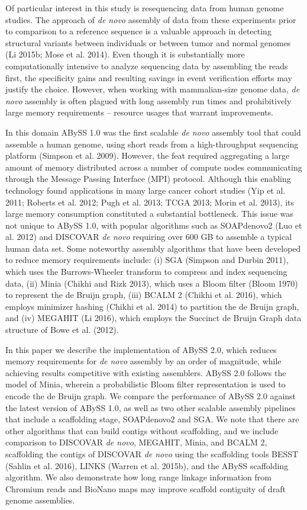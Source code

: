 \documentclass[
  12pt,
  oneside,
  openany]{book}
\begin{document}
Of particular interest in this study is resequencing data from human genome studies. The approach of \emph{de novo} assembly of data from these experiments prior to comparison to a reference sequence is a valuable approach in detecting structural variants between individuals or between tumor and normal genomes (Li 2015b; Mose et al. 2014). Even though it is substantially more computationally intensive to analyze sequencing data by assembling the reads first, the specificity gains and resulting savings in event verification efforts may justify the choice. However, when working with mammalian-size genome data, \emph{de novo} assembly is often plagued with long assembly run times and prohibitively large memory requirements -- resource usages that warrant improvements.

In this domain ABySS 1.0 was the first scalable \emph{de novo} assembly tool that could assemble a human genome, using short reads from a high-throughput sequencing platform (Simpson et al. 2009). However, the feat required aggregating a large amount of memory distributed across a number of compute nodes communicating through the Message Passing Interface (MPI) protocol. Although this enabling technology found applications in many large cancer cohort studies (Yip et al. 2011; Roberts et al. 2012; Pugh et al. 2013; TCGA 2013; Morin et al. 2013), its large memory consumption constituted a substantial bottleneck. This issue was not unique to ABySS 1.0, with popular algorithms such as SOAPdenovo2 (Luo et al. 2012) and DISCOVAR \emph{de novo} requiring over 600 GB to assemble a typical human data set. Some noteworthy assembly algorithms that have been developed to reduce memory requirements include: (i) SGA (Simpson and Durbin 2011), which uses the Burrows-Wheeler transform to compress and index sequencing data, (ii) Minia (Chikhi and Rizk 2013), which uses a Bloom filter (Bloom 1970) to represent the de Bruijn graph, (iii) BCALM 2 (Chikhi et al. 2016), which employs minimizer hashing (Chikhi et al. 2014) to partition the de Bruijn graph, and (iv) MEGAHIT (Li 2016), which employs the Succinct de Bruijn Graph data structure of Bowe et al. (2012).

In this paper we describe the implementation of ABySS 2.0, which reduces memory requirements for \emph{de novo} assembly by an order of magnitude, while achieving results competitive with existing assemblers. ABySS 2.0 follows the model of Minia, wherein a probabilistic Bloom filter representation is used to encode the de Bruijn graph. We compare the performance of ABySS 2.0 against the latest version of ABySS 1.0, as well as two other scalable assembly pipelines that include a scaffolding stage, SOAPdenovo2 and SGA. We note that there are other algorithms that can build contigs without scaffolding, and we include comparison to DISCOVAR \emph{de novo}, MEGAHIT, Minia, and BCALM 2, scaffolding the contigs of DISCOVAR \emph{de novo} using the scaffolding tools BESST (Sahlin et al. 2016), LINKS (Warren et al. 2015b), and the ABySS scaffolding algorithm. We also demonstrate how long range linkage information from Chromium reads and BioNano maps may improve scaffold contiguity of draft genome assemblies.
\end{document}
